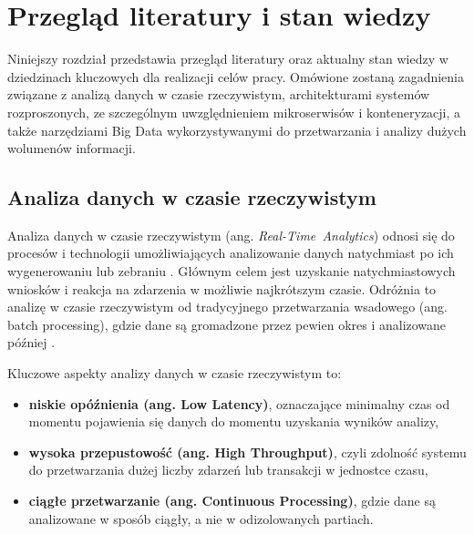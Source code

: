 \section{Przegląd literatury i stan wiedzy}
\label{sec:przeglad_literatury}

Niniejszy rozdział przedstawia przegląd literatury oraz aktualny stan wiedzy w dziedzinach kluczowych dla realizacji celów pracy. Omówione zostaną zagadnienia związane z analizą danych w czasie rzeczywistym, architekturami systemów rozproszonych, ze szczególnym uwzględnieniem mikroserwisów i konteneryzacji, a także narzędziami Big Data wykorzystywanymi do przetwarzania i analizy dużych wolumenów informacji.

\subsection{Analiza danych w czasie rzeczywistym}
\label{subsec:analiza_danych}

Analiza danych w czasie rzeczywistym (ang. \mbox{\textit{Real-Time Analytics}}) odnosi się do procesów i technologii umożliwiających analizowanie danych natychmiast po ich wygenerowaniu lub zebraniu \cite{realtime_analytics}. Głównym celem jest uzyskanie natychmiastowych wniosków i reakcja na zdarzenia w możliwie najkrótszym czasie. Odróżnia to analizę w czasie rzeczywistym od tradycyjnego przetwarzania wsadowego (ang. batch processing), gdzie dane są gromadzone przez pewien okres i analizowane później \cite{data_processing_models}.

\vspace{0.3em}

Kluczowe aspekty analizy danych w czasie rzeczywistym to:

\begin{itemize}
    \item \textbf{niskie opóźnienia (ang. Low Latency)}, oznaczające minimalny czas od momentu pojawienia się danych do momentu uzyskania wyników analizy,
    \item \textbf{wysoka przepustowość (ang. High Throughput)}, czyli zdolność systemu do przetwarzania dużej liczby zdarzeń lub transakcji w jednostce czasu,
    \item \textbf{ciągłe przetwarzanie (ang. Continuous Processing)}, gdzie dane są analizowane w sposób ciągły, a nie w odizolowanych partiach.
\end{itemize}

\vspace{0.3em}

